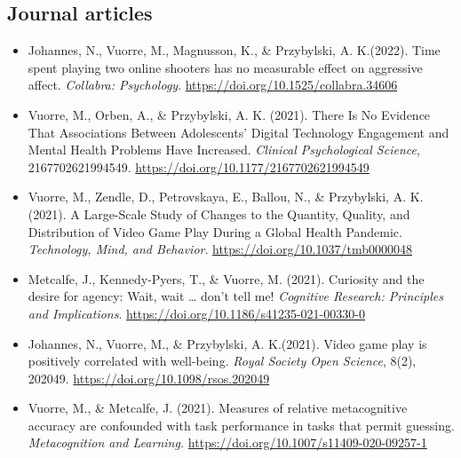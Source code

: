 \documentclass[12pt, a4paper]{article}
\newcommand{\years}[1]{\marginnote{\scriptsize #1}}
\begin{document}
\subsection*{Journal articles}
\begin{itemize}
\item \years{2022} Johannes, N.\footnotemark[1], Vuorre, M.\footnotemark[1], Magnusson, K., \& Przybylski, A. K.\footnotemark[1] (2022). Time spent playing two online shooters has no measurable effect on aggressive affect. \emph{Collabra: Psychology}. \url{https://doi.org/10.1525/collabra.34606}
\item \years{2021} Vuorre, M., Orben, A., \& Przybylski, A. K. (2021). There Is No Evidence That Associations Between Adolescents’ Digital Technology Engagement and Mental Health Problems Have Increased. \emph{Clinical Psychological Science}, 2167702621994549. \url{https://doi.org/10.1177/2167702621994549}
\item Vuorre, M., Zendle, D., Petrovskaya, E., Ballou, N., \& Przybylski, A. K. (2021). A Large-Scale Study of Changes to the Quantity, Quality, and Distribution of Video Game Play During a Global Health Pandemic. \emph{Technology, Mind, and Behavior}. \url{https://doi.org/10.1037/tmb0000048}
\item Metcalfe, J., Kennedy-Pyers, T., \& Vuorre, M. (2021). Curiosity and the desire for agency: Wait, wait … don’t tell me! \emph{Cognitive Research: Principles and Implications}. \url{https://doi.org/10.1186/s41235-021-00330-0}
\item Johannes, N.\footnotemark[1], Vuorre, M.\footnotemark[1], \& Przybylski, A. K.\footnotemark[1] (2021). Video game play is positively correlated with well-being. \emph{Royal Society Open Science}, 8(2), 202049. \url{https://doi.org/10.1098/rsos.202049}
\item Vuorre, M., \& Metcalfe, J. (2021). Measures of relative metacognitive accuracy are confounded with task performance in tasks that permit guessing. \emph{Metacognition and Learning.} \url{https://doi.org/10.1007/s11409-020-09257-1}


\end{itemize}
\end{document}
